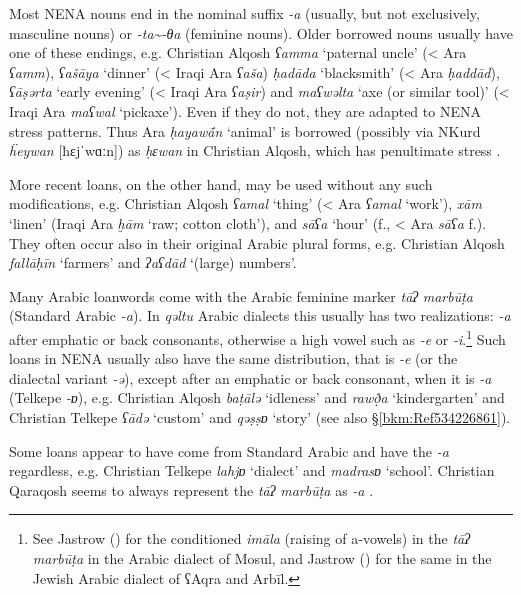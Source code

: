 \documentclass[output=paper]{langsci/langscibook}
\begin{document}
Most NENA nouns end in the nominal suffix \textit{{}-a} (usually, but not exclusively, masculine nouns) or \textit{{}-ta{\textasciitilde}-θa} (feminine nouns). Older borrowed nouns usually have one of these endings, e.g. Christian Alqosh \textit{ʕamma} ‘paternal uncle’ (< Ara \textit{ʕamm}), \textit{ʕašāya} ‘dinner’ (< Iraqi Ara \textit{ʕaša}) \textit{ḥadāda} ‘blacksmith’ (< Ara \textit{ḥaddād}), \textit{ʕāṣərta} ‘early evening’ (< Iraqi Ara \textit{ʕaṣir}) and \textit{maʕwəlta} ‘axe (or similar tool)’ (< Iraqi Ara \textit{maʕwal} ‘pickaxe’). Even if they do not, they are adapted to NENA stress patterns. Thus Ara \textit{ḥayaw\'{ā}n} ‘animal’ is borrowed (possibly via NKurd \textit{ḧeywan} [ħɛjˈwɑːn]) as \textit{ḥɛwan} in Christian Alqosh, which has penultimate stress \citep[81]{Coghill2004}.

More recent loans, on the other hand, may be used without any such modifications, e.g. Christian Alqosh \textit{ʕamal} ‘thing’ (< Ara \textit{ʕamal} ‘work’), \textit{xām} ‘linen’ (Iraqi Ara \textit{ḫām} ‘raw; cotton cloth’), and \textit{sāʕa} ‘hour’ (f., < Ara \textit{sāʕa} f.). They often occur also in their original Arabic plural forms, e.g. Christian Alqosh \textit{fallāḥīn} ‘farmers’ and \textit{ʔaʕdād} ‘(large) numbers’. 

Many Arabic loanwords come with the Arabic feminine marker \textit{tāʔ} \textit{marbūṭa} (Standard Arabic \textit{\nobreakdash-a}). In \textit{qəltu} Arabic dialects this usually has two realizations: \textit{\nobreakdash-a} after emphatic or back consonants, otherwise a high vowel such as \textit{\nobreakdash-e} or \textit{\nobreakdash-i}.\footnote{See Jastrow (\citeyear[40]{Jastrow1979}) for the conditioned \textit{imāla} (raising of a-vowels) in the \textit{tāʔ} \textit{marbūṭa} in the Arabic dialect of Mosul, and Jastrow (\citeyear[70]{Jastrow1990book}) for the same in the Jewish Arabic dialect of ʕAqra and Arbīl.} Such loans in NENA usually also have the same distribution, that is \textit{{}-e} (or the dialectal variant \textit{-ə}), except after an emphatic or back consonant, when it is \textit{\nobreakdash-a} (Telkepe \textit{\nobreakdash-ɒ}), e.g. Christian Alqosh \textit{baṭālə} ‘idleness’ and \textit{rawð̣a} ‘kindergarten’ and Christian Telkepe \textit{ʕādə} ‘custom’ and \textit{qəṣṣɒ} ‘story’ (see also §\ref{bkm:Ref534226861}).

Some loans appear to have come from Standard Arabic and have the \textit{\nobreakdash-a} regardless, e.g. Christian Telkepe \textit{lahjɒ} ‘dialect’ and \textit{madrasɒ} ‘school’. Christian Qaraqosh seems to always represent the \textit{tāʔ} \textit{marbūṭa} as \textit{{}-a} \citep[204]{Khan2002}.
\end{document}
